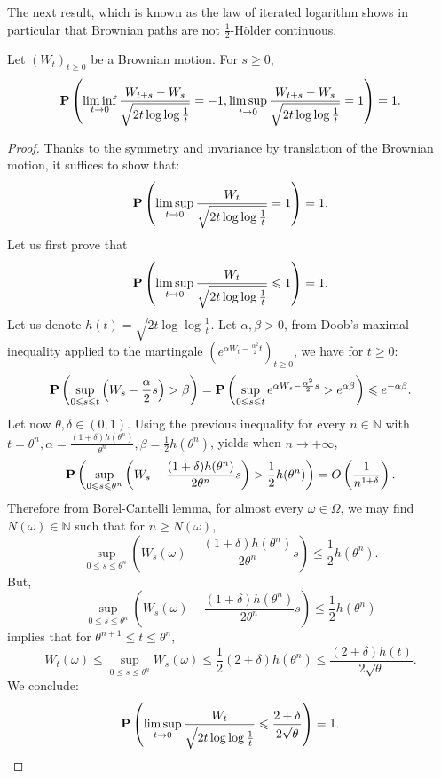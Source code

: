 The next result, which is known as the law of iterated logarithm shows in particular that Brownian paths are not $\frac{1}{2}$-H\"older continuous.
	\begin{theorem}
		Let $(W_t)_{t\ge 0}$ be a Brownian motion. For $s \ge 0$,
		\[
		{\mathbf P} \left( \liminf_{t \rightarrow 0} \frac{W_{t+s}-W_s}{\sqrt{2t \log  \log  \frac{1}{t}}} =-1 , \limsup_{t \rightarrow 0} \frac{W_{t+s}-W_s}{\sqrt{2t\log  \log  \frac{1}{t}}} =1 \right)=1.  
		\]
	\end{theorem}
	\begin{proof}
		Thanks to the symmetry and invariance by translation of the Brownian motion, it suffices to show that:
		$$
		{\mathbf P} \left( \limsup_{t \rightarrow 0} \frac{W_{t}}{\sqrt{2t\log  \log  \frac{1}{t}}} =1 \right)=1.  
		$$
		Let us first prove that 
		$$
		{\mathbf P} \left( \limsup_{t \rightarrow 0} \frac{W_{t}}{\sqrt{2t \log  \log  \frac{1}{t}}} \leqslant 1 \right)=1.  
		$$
		Let us denote $h(t)=\sqrt{2t \log  \log  \frac{1}{t}}$.   Let $\alpha, \beta >0$, from Doob’s maximal inequality applied to the martingale $\left(e^{\alpha W_t-\frac{\alpha^2}{2}t} \right)_{t \ge 0}$, we have for $t \ge 0$:
		\[
		{\mathbf P}  \left(  \sup_{0 \leqslant s \leqslant t} \left( W_s-\frac{\alpha}{2}s\right)>\beta \right)={\mathbf P}  \left(  \sup_{0 \leqslant s \leqslant t} e^{\alpha W_s -\frac{\alpha^2}{2}s} >e^{\alpha \beta}\right) \leqslant e^{-\alpha \beta}.
		\]
		Let now $\theta , \delta \in (0,1)$. Using the previous inequality for every $n \in \mathbb{N}$ with $t=\theta^n, \alpha=\frac{(1+\delta)h(\theta^n)}{\theta^n}, \beta=\frac{1}{2} h (\theta^n)$,  yields when $n \rightarrow +\infty$,
		$$
		{\mathbf P}  \left(  \sup_{0 \leqslant s \leqslant \theta^n} \left( W_s -\frac{(1+\delta)h(\theta^n)}{2\theta^n}s\right)>\frac{1}{2} h (\theta^n) \right)=O\left( \frac{1}{n^{1+\delta}} \right).  
		$$
		Therefore from Borel-Cantelli lemma, for almost every $\omega \in \Omega$, we may find $N(\omega)\in \mathbb{N}$ such that for $n \ge N(\omega)$,
		$$
		\sup_{0 \leq s \leq \theta^n} \left( W_s(\omega)-\frac{(1+\delta)h(\theta^n)}{2\theta^n} s\right) \leq \frac{1}{2}h (\theta^n).  
		$$
		But,
		$$
		\sup_{0 \leq s \leq \theta^n} \left( W_s(\omega) -\frac{(1+\delta)h(\theta^n)}{2\theta^n} s\right) \leq \frac{1}{2} h (\theta^n)  
		$$
		implies that for $\theta^{n+1} \leq t\leq \theta^n$,
		$$
		W_t (\omega) \leq \sup_{0 \leq s \leq \theta^n} W_s(\omega) \leq \frac{1}{2} (2+\delta)h (\theta^n) \leq \frac{(2+\delta)h(t)}{2\sqrt{\theta}}.  
		$$
		We conclude:
		$$
		{\mathbf P} \left( \limsup_{t \rightarrow 0} \frac{W_{t}}{\sqrt{2t\log  \log  \frac{1}{t}}} \leqslant \frac{2+\delta}{2\sqrt{\theta}}\right)=1.  
$$
\end{proof}
